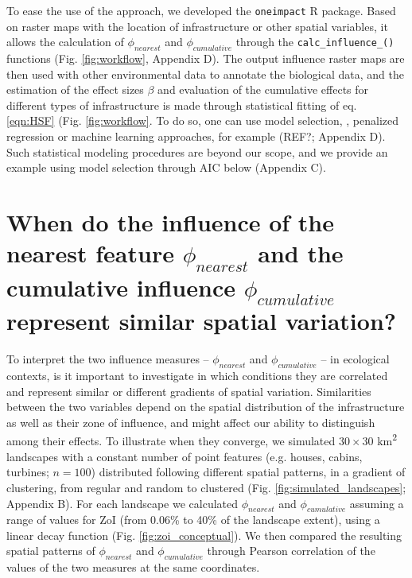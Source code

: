 \documentclass[titlepage]{article}
\begin{document}
To ease the use of the approach, we developed the \verb|oneimpact| R package. Based on raster maps with the location of infrastructure or other spatial variables, it allows the calculation of $\phi_{nearest}$ and $\phi_{cumulative}$ through the \verb|calc_influence_()| functions (Fig. \ref{fig:workflow}, Appendix D). The output influence raster maps are then used with other environmental data to annotate the biological data, and the estimation of the effect sizes $\beta$ and evaluation of the cumulative effects for different types of infrastructure is made through statistical fitting of eq. \ref{eqn:HSF} (Fig. \ref{fig:workflow}. To do so, one can use model selection, \citep{burnham_model_2002}, penalized regression \citep{lee_estimating_2020} or machine learning approaches, for example (REF?; Appendix D). Such statistical modeling procedures are beyond our scope, and we provide an example using model selection through AIC below (Appendix C).   

\section{When do the influence of the nearest feature $\phi_{nearest}$ and the cumulative influence $\phi_{cumulative}$ represent similar spatial variation?}

To interpret the two influence measures -- $\phi_{nearest}$ and $\phi_{cumulative}$ -- in ecological contexts, is it important to investigate in which conditions they are correlated and represent similar or different gradients of spatial variation. Similarities between the two variables depend on the spatial distribution of the infrastructure as well as their zone of influence, and might affect our ability to distinguish among their effects. To illustrate when they converge, we simulated $30 \times 30$ km\textsuperscript{2} landscapes with a constant number of point features (e.g. houses, cabins, turbines; $n = 100$) distributed following different spatial patterns, in a gradient of clustering, from regular and random to clustered (Fig. \ref{fig:simulated_landscapes}; Appendix B). For each landscape we calculated $\phi_{nearest}$ and $\phi_{cumulative}$ assuming a range of values for ZoI (from 0.06\% to 40\% of the landscape extent), using a linear decay function (Fig. \ref{fig:zoi_conceptual}). We then compared the resulting spatial patterns of $\phi_{nearest}$ and $\phi_{cumulative}$ through Pearson correlation of the values of the two measures at the same coordinates. 
\end{document}
